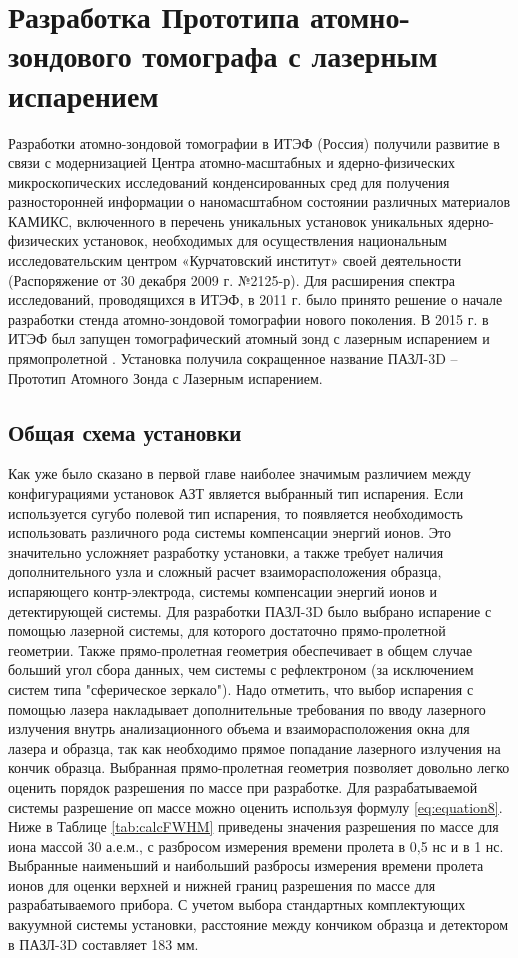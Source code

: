 \chapter{Разработка  Прототипа атомно-зондового томографа с лазерным испарением}\label{ch:ch2}

Разработки атомно-зондовой томографии в ИТЭФ (Россия) получили развитие в связи с модернизацией Центра атомно-масштабных и ядерно-физических микроскопических исследований конденсированных сред для получения разносторонней информации о наномасштабном состоянии различных материалов КАМИКС, включенного в перечень уникальных установок уникальных ядерно-физических установок, необходимых для осуществления национальным исследовательским центром «Курчатовский институт» своей деятельности (Распоряжение от 30 декабря 2009 г. №2125-р). Для расширения спектра исследований, проводящихся в ИТЭФ, в 2011 г. было принято решение о начале разработки стенда атомно-зондовой томографии нового поколения. В 2015 г. в ИТЭФ был запущен томографический атомный зонд с лазерным испарением и прямопролетной \cite{scbibAPPLE}. Установка получила сокращенное название ПАЗЛ-3D – Прототип Атомного Зонда с Лазерным испарением. 

\section{Общая схема установки}\label{sec:ch2/sec1}

Как уже было сказано в первой главе наиболее значимым различием между конфигурациями установок АЗТ является выбранный тип испарения. Если используется сугубо полевой тип испарения, то появляется необходимость использовать различного рода системы компенсации энергий ионов. Это значительно усложняет разработку установки, а также требует наличия дополнительного узла и сложный расчет взаиморасположения образца, испаряющего контр-электрода, системы компенсации энергий ионов и детектирующей системы. Для разработки ПАЗЛ-3D было выбрано испарение с помощью лазерной системы, для которого достаточно прямо-пролетной геометрии. Также прямо-пролетная геометрия обеспечивает в общем случае больший угол сбора данных, чем системы с рефлектроном (за исключением систем типа "сферическое зеркало"). Надо отметить, что выбор испарения с помощью лазера накладывает дополнительные требования по вводу лазерного излучения внутрь анализационного объема и взаиморасположения окна для лазера и образца, так как необходимо прямое попадание лазерного излучения на кончик образца.
Выбранная прямо-пролетная геометрия позволяет довольно легко оценить порядок разрешения по массе при разработке. Для разрабатываемой системы разрешение оп массе можно оценить используя формулу \cref{eq:equation8}. Ниже в Таблице \cref{tab:calcFWHM} приведены значения разрешения по массе для иона массой 30 а.е.м., с разбросом измерения времени пролета в 0,5 нс и в 1 нс. Выбранные наименьший и наибольший разбросы измерения времени пролета ионов для оценки верхней и нижней границ разрешения по массе для разрабатываемого прибора. С учетом выбора стандартных комплектующих вакуумной системы установки, расстояние между кончиком образца и детектором в ПАЗЛ-3D составляет 183 мм.

